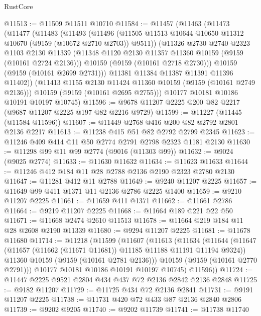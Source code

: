 \begin{lexlean}{RustCore}
\begin{coremodule}
@11513 := @11509 @11511 @10710
@11584 := @11457
    (@11463
      (@11473
        (@11477
          (@11483
            (@11493
              (@11496
                (@11505 @11513 @10644 @10650 @11312 @10670 (@9159 (@10672 @2710 @2703)) @9511))
              (@11326
                @2730
                @2740
                @2323
                @1103
                @2130
                @11339
                (@11348 @1120 @2130 @11357 @11360 @10159 (@9159 (@10161 @2724 @2136)))
                @10159
                (@9159 (@10161 @2718 @2730)))
              @10159
              (@9159 (@10161 @2699 @2731)))
            @11381
            @11384
            @11387
            @11391
            @11396
            @11402))
        (@11413 @1155 @2130 @11424 @11360 @10159 (@9159 (@10161 @2749 @2136)))
        @10159
        (@9159 (@10161 @2695 @2755)))
      @10177
      @10181
      @10186
      @10191
      @10197
      @10745)
@11596 := @9678 @11207 @2225 @200 @82 @2217 (@9687 @11207 @2225 @197 @82 @2216 @9729)
@11599 := @11227 (@11445 (@11584 @11596))
@11607 := @11449 @2768 @416 @200 @82 @2792 @2801 @2136 @2217
@11613 := @11238 @415 @51 @82 @2792 @2799 @2345
@11623 := @11246 @409 @414 @11 @50 @2774 @2791 @2798 @2323 @1181 @2130
@11630 := @11298 @99 @11 @99 @2774 (@9016 (@11303 @99))
@11632 := @9024 (@9025 @2774)
@11633 := @11630 @11632
@11634 := @11623 @11633
@11644 := @11246 @412 @184 @11 @28 @2788 @2136 @2190 @2323 @2780 @2130
@11647 := @11281 @412 @11 @2788
@11649 := @9240 @11207 @2225
@11657 := @11649 @99 @411 @1371 @11 @2136 @2786 @2225 @1400
@11659 := @9210 @11207 @2225
@11661 := @11659 @411 @1371
@11662 := @11661 @2786
@11664 := @9219 @11207 @2225
@11668 := @11664 @189 @221 @22 @50
@11671 := @11668 @2474 @2610 @11513
@11678 := @11664 @219 @184 @11 @28 @2608 @2190 @11339
@11680 := @9294 @11207 @2225
@11681 := @11678 @11680
@11714 := @11218
    (@11599
      (@11607
        (@11613
          (@11634
            (@11644
              (@11647 (@11657 (@11662 (@11671 @11681)) @11185 @11188 @11191 @11194 @9324))
              @11360
              @10159
              (@9159 (@10161 @2781 @2136)))
            @10159
            (@9159 (@10161 @2770 @2791)))
          @10177
          @10181
          @10186
          @10191
          @10197
          @10745)
        @11596))
@11724 := @11447 @2225 @9521 @2804 @434 @437 @72 @2136 @2842 @2136 @2848
@11725 := @9182 @11207
@11729 := @11725 @434 @72 @2136 @2841
@11731 := @9191 @11207 @2225
@11738 := @11731 @420 @72 @433 @87 @2136 @2840 @2806
@11739 := @9202 @9205
@11740 := @9202 @11739
@11741 := @11738 @11740

\end{coremodule}
\end{lexlean}
